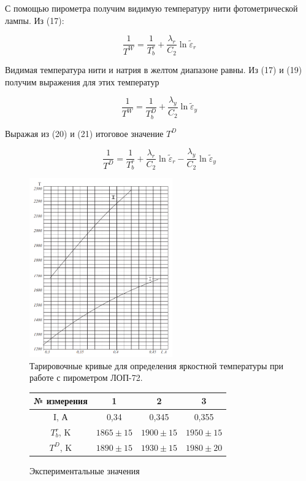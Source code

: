 \documentclass[12pt,a4paper]{article}
\begin{document}
\par С помощью пирометра получим видимую температуру нити фотометрической лампы. Из (17):

\begin{equation}
\frac{1}{T^W} = \frac{1}{T_b^r}+\frac{\lambda_r}{C_2}\ln{\tilde{
\varepsilon}_r}
\end{equation}

\par Видимая температура нити и натрия в желтом диапазоне равны. Из (17) и (19) получим выражения для этих температур

\begin{equation}
\frac{1}{T^W} = \frac{1}{T_b^D}+\frac{\lambda_y}{C_2}\ln{\tilde{
\varepsilon}_y}
\end{equation}

\par Выражая из (20) и (21) итоговое значение $T^D$

\begin{equation}
\frac{1}{T^D} = \frac{1}{T_b^r}+\frac{\lambda_r}{C_2}\ln{\tilde{
\varepsilon}_r} - \frac{\lambda_y}{C_2}\ln{\tilde{
\varepsilon}_y}
\end{equation}


\begin{figure}[H]
	\begin{center}
		\includegraphics[width = 0.55\textwidth]{MSS-1-5}
		\caption{Тарировочные кривые для определения яркостной температуры при работе с пирометром ЛОП-72.}
	\end{center}
\end{figure}

\begin{figure}
\begin{center}
\begin{tabular}{|c|c|c|c|}
\hline 
№ измерения & 1 & 2 & 3 \\ 
\hline 
I, А & 0,34 & 0,345 & 0,355 \\ 
\hline 
$T_b^r$, K & $1865 \pm 15$ & $1900 \pm 15$ & $1950 \pm 15$ \\ 
\hline 
$T^D$, K & $1890 \pm 15$ & $1930 \pm 15$ & $1980 \pm 20$ \\ 
\hline 
\end{tabular} 
\caption{Экспериментальные значения}
\end{center}
\end{figure}
\end{document}
